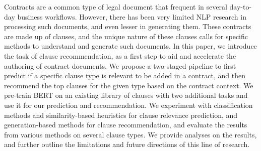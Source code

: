 Contracts are a common type of legal document that frequent in several day-to-day business workflows. However, there has been very limited NLP research in processing such documents, and even lesser in generating them.  These contracts are made up of clauses, and the unique nature of these clauses calls for specific methods to understand and generate such documents. In this paper, we introduce the task of clause recommendation, as a first step to aid and accelerate the authoring of contract documents.  We propose a two-staged pipeline to first predict if a specific clause type is relevant to be added in a contract, and then recommend the top clauses for the given type based on the contract context. We pre-train BERT on an existing library of clauses with two additional tasks and use it for our prediction and recommendation. We experiment with classification methods and similarity-based heuristics for clause relevance prediction, and generation-based methods for clause recommendation, and evaluate the results from various methods on several clause types. We provide analyses on the results, and further outline the limitations and future directions of this line of research.

